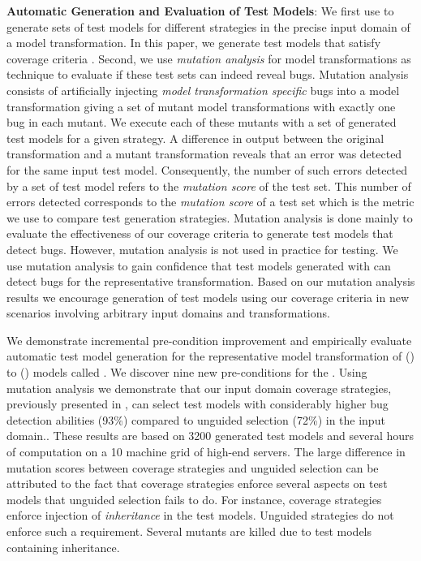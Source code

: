 \textbf{Automatic Generation and Evaluation of Test Models}: We first use {\Pramana} to generate sets of  test models for different strategies in the precise input domain of a model transformation. In this paper, we generate test models that satisfy coverage criteria \cite{franck2007}.  Second, we use \emph{mutation analysis} \cite{demillo1978} \cite{mottu2006} for model transformations as technique to evaluate if these test sets can indeed reveal bugs. Mutation analysis consists of artificially injecting \emph{model transformation specific} bugs into a model transformation giving a set of mutant model transformations with exactly one bug in each mutant. We execute each of these mutants with a set  of generated test models for a given strategy. A difference in output between the original transformation and a mutant transformation reveals that an error was detected for the same input test model. Consequently, the number of such errors detected by a set of test model refers to the \emph{mutation score} of the test set. This number of errors detected corresponds to the \emph{mutation score} of a test set which is the metric we use to compare test generation strategies. Mutation analysis is done mainly to evaluate the effectiveness of our coverage criteria to generate test models that detect bugs. However, mutation analysis is not used in practice for testing. We use mutation analysis to gain confidence that test models generated with {\Pramana} can detect bugs for the representative transformation. Based on our mutation analysis results we encourage  generation of test models using our coverage criteria in new scenarios involving arbitrary input domains and transformations.

We demonstrate incremental pre-condition improvement and empirically evaluate automatic test model generation for  the  representative model transformation of {\textUMLCD} ({\UMLCD}) to {\textRDBMS}  ({\RDBMS}) models called {\transfo}.  We discover nine new pre-conditions for the {\transfo}. Using mutation analysis we demonstrate that  our input domain coverage strategies, previously presented in \cite{franck2007}, can  select test models with considerably higher bug detection abilities (93\%) compared to unguided selection (72\%) in the input domain.. These results are based on 3200 generated test models and several hours of computation on a 10 machine grid of high-end servers.  The large difference in mutation scores between coverage strategies and unguided selection can be attributed to  the fact that coverage strategies enforce several aspects on test models that unguided selection fails to do. For instance, coverage strategies enforce injection of \emph{inheritance} in the {\UMLCD} test models. Unguided strategies do not enforce such a requirement. Several mutants are killed due to test models containing inheritance. 
	 

